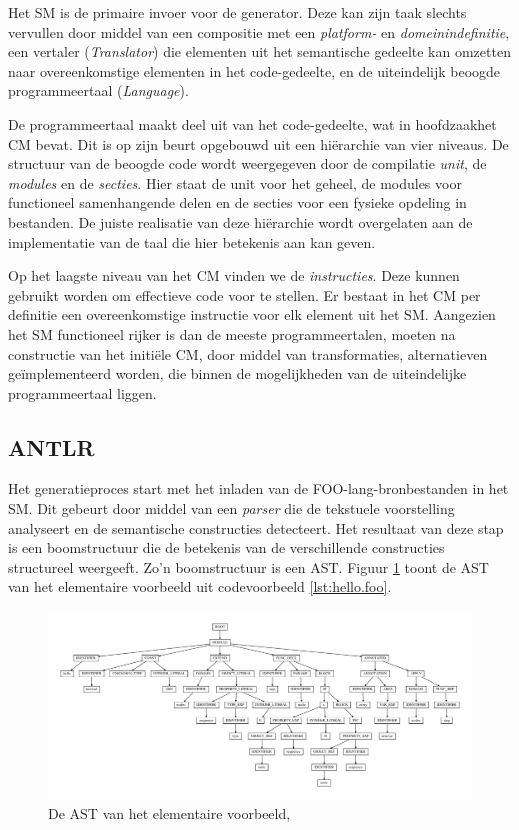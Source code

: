 Het SM is de primaire invoer voor de generator. Deze kan zijn taak slechts
vervullen door middel van een compositie met een \emph{platform-} en
\emph{domeinindefinitie}, een vertaler (\emph{Translator}) die elementen uit
het semantische gedeelte kan omzetten naar overeenkomstige elementen in het
code-gedeelte, en de uiteindelijk beoogde programmeertaal (\emph{Language}).

De programmeertaal maakt deel uit van het code-gedeelte, wat in hoofdzaakhet CM
bevat. Dit is op zijn beurt opgebouwd uit een hi\"erarchie van vier niveaus. De
structuur van de beoogde code wordt weergegeven door de compilatie \emph{unit},
de \emph{modules} en de \emph{secties}. Hier staat de unit voor het geheel, de
modules voor functioneel samenhangende delen en de secties voor een fysieke
opdeling in bestanden. De juiste realisatie van deze hi\"erarchie wordt
overgelaten aan de implementatie van de taal die hier betekenis aan kan geven.

Op het laagste niveau van het CM vinden we de \emph{instructies}. Deze kunnen
gebruikt worden om effectieve code voor te stellen. Er bestaat in het CM per
definitie een overeenkomstige instructie voor elk element uit het SM. Aangezien
het SM functioneel rijker is dan de meeste programmeertalen, moeten na
constructie van het initi\"ele CM, door middel van transformaties,
alternatieven ge\"implementeerd worden, die binnen de mogelijkheden van de
uiteindelijke programmeertaal liggen.

\subsection{ANTLR}
\label{subsection:devel-antlr}

Het generatieproces start met het inladen van de FOO-lang-bronbestanden in het
SM. Dit gebeurt door middel van een \emph{parser} die de tekstuele voorstelling
analyseert en de semantische constructies detecteert. Het resultaat van deze
stap is een boomstructuur die de betekenis van de verschillende constructies
structureel weergeeft. Zo'n boomstructuur is een AST. Figuur
\ref{fig:devel-ast} toont de AST van het elementaire voorbeeld uit
codevoorbeeld \ref{lst:hello.foo}.

\begin{figure}[ht]
  \centering
  \includegraphics[width=\linewidth]{resources/hello_ast.pdf}
  \caption{De AST van het elementaire voorbeeld, }
  \label{fig:devel-ast}
\end{figure}

